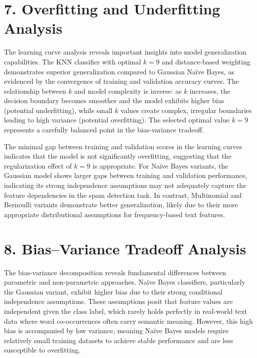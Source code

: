 \documentclass[11pt]{article}
\begin{document}
\section*{7. Overfitting and Underfitting Analysis}
The learning curve analysis reveals important insights into model generalization capabilities. The KNN classifier with optimal $k=9$ and distance-based weighting demonstrates superior generalization compared to Gaussian Na\"ive Bayes, as evidenced by the convergence of training and validation accuracy curves. The relationship between $k$ and model complexity is inverse: as $k$ increases, the decision boundary becomes smoother and the model exhibits higher bias (potential underfitting), while small $k$ values create complex, irregular boundaries leading to high variance (potential overfitting). The selected optimal value $k=9$ represents a carefully balanced point in the bias-variance tradeoff.

The minimal gap between training and validation scores in the learning curves indicates that the model is not significantly overfitting, suggesting that the regularization effect of $k=9$ is appropriate. For Na\"ive Bayes variants, the Gaussian model shows larger gaps between training and validation performance, indicating its strong independence assumptions may not adequately capture the feature dependencies in the spam detection task. In contrast, Multinomial and Bernoulli variants demonstrate better generalization, likely due to their more appropriate distributional assumptions for frequency-based text features.

\section*{8. Bias--Variance Tradeoff Analysis}
The bias-variance decomposition reveals fundamental differences between parametric and non-parametric approaches. Na\"ive Bayes classifiers, particularly the Gaussian variant, exhibit higher bias due to their strong conditional independence assumptions. These assumptions posit that feature values are independent given the class label, which rarely holds perfectly in real-world text data where word co-occurrences often carry semantic meaning. However, this high bias is accompanied by low variance, meaning Na\"ive Bayes models require relatively small training datasets to achieve stable performance and are less susceptible to overfitting.
\end{document}
